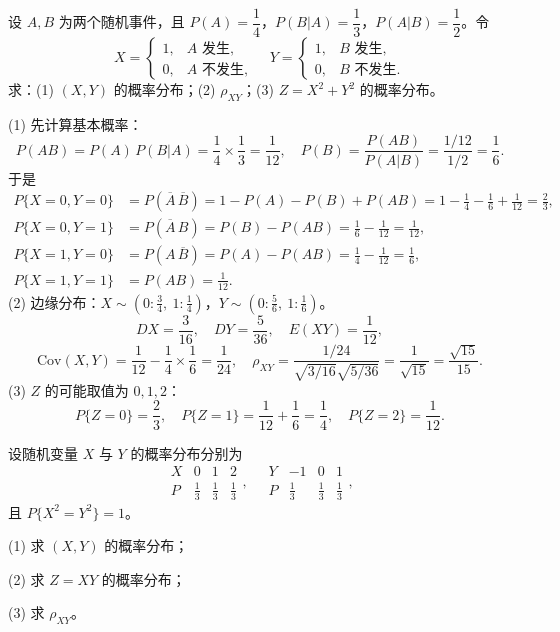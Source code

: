 \documentclass[lang=cn,11pt]{elegantbook}
\begin{document}
\begin{exercise}\label{exer:4-s13-event}
设 \(A, B\) 为两个随机事件，且 \(P(A) = \dfrac{1}{4}\)，\(P(B|A) = \dfrac{1}{3}\)，\(P(A|B) = \dfrac{1}{2}\)。令
\[
X = \begin{cases} 1, & A \text{ 发生}, \\ 0, & A \text{ 不发生}, \end{cases}\quad
Y = \begin{cases} 1, & B \text{ 发生}, \\ 0, & B \text{ 不发生}. \end{cases}
\]
求：(1) \((X,Y)\) 的概率分布；(2) \(\rho_{XY}\)；(3) \(Z = X^2 + Y^2\) 的概率分布。
\end{exercise}
\begin{solution}
(1) 先计算基本概率：
\[
P(AB) = P(A)\,P(B|A) = \frac{1}{4} \times \frac{1}{3} = \frac{1}{12},\quad
P(B) = \frac{P(AB)}{P(A|B)} = \frac{1/12}{1/2} = \frac{1}{6}.
\]
于是
\begin{align*}
P\{X=0,Y=0\} &= P(\overline{A}\,\overline{B}) = 1 - P(A) - P(B) + P(AB) = 1 - \frac{1}{4} - \frac{1}{6} + \frac{1}{12} = \frac{2}{3}, \\
P\{X=0,Y=1\} &= P(\overline{A}\,B) = P(B) - P(AB) = \frac{1}{6} - \frac{1}{12} = \frac{1}{12}, \\
P\{X=1,Y=0\} &= P(A\,\overline{B}) = P(A) - P(AB) = \frac{1}{4} - \frac{1}{12} = \frac{1}{6}, \\
P\{X=1,Y=1\} &= P(AB) = \frac{1}{12}.
\end{align*}
(2) 边缘分布：\(X \sim (0:\frac{3}{4},\ 1:\frac{1}{4})\)，\(Y \sim (0:\frac{5}{6},\ 1:\frac{1}{6})\)。
\[
DX = \frac{3}{16},\quad DY = \frac{5}{36},\quad E(XY) = \frac{1}{12},
\]
\[
\mathrm{Cov}(X,Y) = \frac{1}{12} - \frac{1}{4} \times \frac{1}{6} = \frac{1}{24},\quad
\rho_{XY} = \frac{1/24}{\sqrt{3/16}\sqrt{5/36}} = \frac{1}{\sqrt{15}} = \frac{\sqrt{15}}{15}.
\]
(3) \(Z\) 的可能取值为 \(0, 1, 2\)：
\[
P\{Z=0\} = \frac{2}{3},\quad P\{Z=1\} = \frac{1}{12}+\frac{1}{6} = \frac{1}{4},\quad P\{Z=2\} = \frac{1}{12}.
\]
\end{solution}

\begin{exercise}\label{exer:4-7-joint}
设随机变量 \(X\) 与 \(Y\) 的概率分布分别为
\[
\begin{array}{c|ccc}
X & 0 & 1 & 2 \\
\hline
P & \frac{1}{3} & \frac{1}{3} & \frac{1}{3}
\end{array},\quad
\begin{array}{c|ccc}
Y & -1 & 0 & 1 \\
\hline
P & \frac{1}{3} & \frac{1}{3} & \frac{1}{3}
\end{array},
\]
且 \(P\{X^2 = Y^2\} = 1\)。\par
(1) 求 \((X,Y)\) 的概率分布；\par
(2) 求 \(Z = XY\) 的概率分布；\par
(3) 求 $\rho_{XY}$。
\end{exercise}
\end{document}
